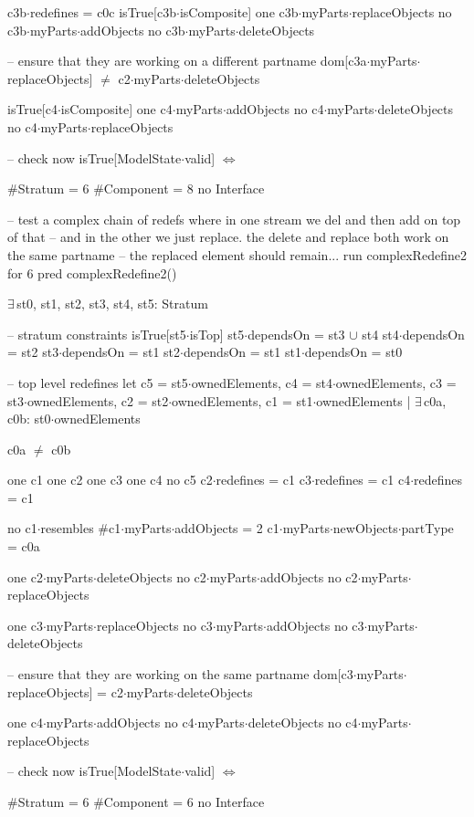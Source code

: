 {{{      c3b$\cdot$redefines = c0c
      isTrue[c3b$\cdot$isComposite]
      one c3b$\cdot$myParts$\cdot$replaceObjects
      no c3b$\cdot$myParts$\cdot$addObjects
      no c3b$\cdot$myParts$\cdot$deleteObjects
            
      -- ensure that they are working on a different partname
      dom[c3a$\cdot$myParts$\cdot$replaceObjects] $\neq$ c2$\cdot$myParts$\cdot$deleteObjects
      
      isTrue[c4$\cdot$isComposite]
      one c4$\cdot$myParts$\cdot$addObjects
      no c4$\cdot$myParts$\cdot$deleteObjects
      no c4$\cdot$myParts$\cdot$replaceObjects
      
      -- check now
      isTrue[ModelState$\cdot$valid] $\Longleftrightarrow$
      {
      }
    }
  }

  #Stratum = 6
  #Component = 8
  no Interface
}

-- test a complex chain of redefs where in one stream we del and then add on top of that
-- and in the other we just replace.  the delete and replace both work on the same partname
-- the replaced element should remain...
run complexRedefine2 for 6
pred complexRedefine2()
{
  $\exists\,$st0, st1, st2, st3, st4, st5: Stratum
  {
    -- stratum constraints
    isTrue[st5$\cdot$isTop]
    st5$\cdot$dependsOn = st3 $\cup$ st4
    st4$\cdot$dependsOn = st2
    st3$\cdot$dependsOn = st1
    st2$\cdot$dependsOn = st1
    st1$\cdot$dependsOn = st0

    -- top level redefines
    let
      c5 = st5$\cdot$ownedElements,
      c4 = st4$\cdot$ownedElements,
      c3 = st3$\cdot$ownedElements,
      c2 = st2$\cdot$ownedElements,
      c1 = st1$\cdot$ownedElements |
    $\exists\,$c0a, c0b: st0$\cdot$ownedElements
    {
      c0a $\neq$ c0b
      
      one c1 one c2 one c3 one c4 no c5
      c2$\cdot$redefines = c1
      c3$\cdot$redefines  = c1
      c4$\cdot$redefines = c1
  
      no c1$\cdot$resembles
      #c1$\cdot$myParts$\cdot$addObjects = 2
      c1$\cdot$myParts$\cdot$newObjects$\cdot$partType = c0a
      
      one c2$\cdot$myParts$\cdot$deleteObjects
      no c2$\cdot$myParts$\cdot$addObjects
      no c2$\cdot$myParts$\cdot$replaceObjects
      
      one c3$\cdot$myParts$\cdot$replaceObjects
      no c3$\cdot$myParts$\cdot$addObjects
      no c3$\cdot$myParts$\cdot$deleteObjects
      
      -- ensure that they are working on the same partname
      dom[c3$\cdot$myParts$\cdot$replaceObjects] = c2$\cdot$myParts$\cdot$deleteObjects
      
      one c4$\cdot$myParts$\cdot$addObjects
      no c4$\cdot$myParts$\cdot$deleteObjects
      no c4$\cdot$myParts$\cdot$replaceObjects
      
      -- check now
      isTrue[ModelState$\cdot$valid] $\Longleftrightarrow$
      {
      }
    }
  }

  #Stratum = 6
  #Component = 6
  no Interface
}

